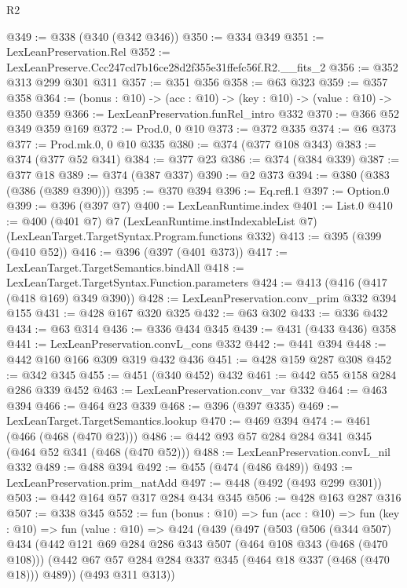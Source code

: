 \begin{lexlean}{R2}
\begin{coremodule}
@349 := @338 (@340 (@342 @346))
@350 := @334 @349
@351 := LexLeanPreservation.Rel
@352 := LexLeanPreserve.Ccc247cd7b16ce28d2f355e31ffefc56f.R2.__fits_2
@356 := @352 @313 @299 @301 @311
@357 := @351 @356
@358 := @63 @323
@359 := @357 @358
@364 := (bonus : @10) -> (acc : @10) -> (key : @10) -> (value : @10) -> @350 @359
@366 := LexLeanPreservation.funRel_intro @332
@370 := @366 @52 @349 @359 @169
@372 := Prod.{0, 0} @10
@373 := @372 @335
@374 := @6 @373
@377 := Prod.mk.{0, 0} @10 @335
@380 := @374 (@377 @108 @343)
@383 := @374 (@377 @52 @341)
@384 := @377 @23
@386 := @374 (@384 @339)
@387 := @377 @18
@389 := @374 (@387 @337)
@390 := @2 @373
@394 := @380 (@383 (@386 (@389 @390)))
@395 := @370 @394
@396 := Eq.refl.{1}
@397 := Option.{0}
@399 := @396 (@397 @7)
@400 := LexLeanRuntime.index
@401 := List.{0}
@410 := @400
    (@401 @7)
    @7
    (LexLeanRuntime.instIndexableList @7)
    (LexLeanTarget.TargetSyntax.Program.functions @332)
@413 := @395 (@399 (@410 @52))
@416 := @396 (@397 (@401 @373))
@417 := LexLeanTarget.TargetSemantics.bindAll
@418 := LexLeanTarget.TargetSyntax.Function.parameters
@424 := @413 (@416 (@417 (@418 @169) @349 @390))
@428 := LexLeanPreservation.conv_prim @332 @394 @155
@431 := @428 @167 @320 @325
@432 := @63 @302
@433 := @336 @432
@434 := @63 @314
@436 := @336 @434 @345
@439 := @431 (@433 @436) @358
@441 := LexLeanPreservation.convL_cons @332
@442 := @441 @394
@448 := @442 @160 @166 @309 @319 @432 @436
@451 := @428 @159 @287 @308
@452 := @342 @345
@455 := @451 (@340 @452) @432
@461 := @442 @55 @158 @284 @286 @339 @452
@463 := LexLeanPreservation.conv_var @332
@464 := @463 @394
@466 := @464 @23 @339
@468 := @396 (@397 @335)
@469 := LexLeanTarget.TargetSemantics.lookup
@470 := @469 @394
@474 := @461 (@466 (@468 (@470 @23)))
@486 := @442 @93 @57 @284 @284 @341 @345 (@464 @52 @341 (@468 (@470 @52)))
@488 := LexLeanPreservation.convL_nil @332
@489 := @488 @394
@492 := @455 (@474 (@486 @489))
@493 := LexLeanPreservation.prim_natAdd
@497 := @448 (@492 (@493 @299 @301))
@503 := @442 @164 @57 @317 @284 @434 @345
@506 := @428 @163 @287 @316
@507 := @338 @345
@552 := fun (bonus : @10) =>
  fun (acc : @10) =>
  fun (key : @10) =>
  fun (value : @10) =>
  @424
    (@439
      (@497
        (@503
          (@506
            (@344 @507)
            @434
            (@442
              @121
              @69
              @284
              @286
              @343
              @507
              (@464 @108 @343 (@468 (@470 @108)))
              (@442 @67 @57 @284 @284 @337 @345 (@464 @18 @337 (@468 (@470 @18))) @489))
            (@493 @311 @313))

\end{coremodule}
\end{lexlean}
